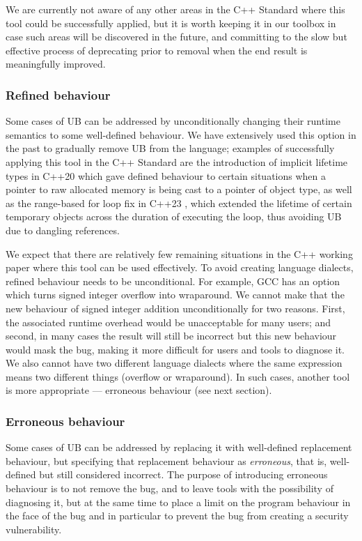 {We are currently not aware of any other areas in the C++ Standard where this tool could be successfully applied, but it is worth keeping it in our toolbox in case such areas will be discovered in the future, and committing to the slow but effective process of deprecating prior to removal when the end result is meaningfully improved.

\subsubsection{Refined behaviour}
\label{refined}

Some cases of UB can be addressed by unconditionally changing their runtime semantics to some well-defined behaviour. We have extensively used this option in the past to gradually remove UB from the language; examples of successfully applying this tool in the C++ Standard are the introduction of implicit lifetime types in C++20 \cite{P0593R6} which gave defined behaviour to certain situations when a pointer to raw allocated memory is being cast to a pointer of object type, as well as the range-based for loop fix in C++23 \cite{P2644R1},  which extended the lifetime of certain temporary objects across the duration of executing the loop, thus avoiding UB due to dangling references. 

We expect that there are relatively few remaining situations in the C++ working paper where this tool can be used effectively. To avoid creating language dialects, refined behaviour needs to be unconditional. For example, GCC has an option  which turns signed integer overflow into wraparound. We cannot make that the new behaviour of signed integer addition unconditionally for two reasons. First, the associated runtime overhead would be unacceptable for many users; and second, in many cases the result will still be incorrect but this new behaviour would mask the bug, making it more difficult for users and tools to diagnose it. We also cannot have two different language dialects where the same expression means two different things (overflow or wraparound).  In such cases, another tool is more appropriate --- erroneous behaviour (see next section).

\subsubsection{Erroneous behaviour}
\label{erroneous}

Some cases of UB can be addressed by replacing it with well-defined replacement behaviour, but specifying that replacement behaviour as \emph{erroneous}, that is, well-defined but still considered incorrect. The purpose of introducing erroneous behaviour is to not remove the bug, and to leave tools with the possibility of diagnosing it, but at the same time to place a limit on the program behaviour in the face of the bug and in particular to prevent the bug from creating a security vulnerability.

}
